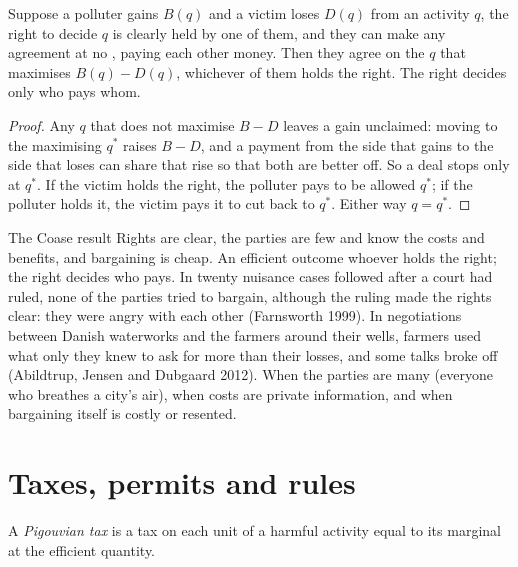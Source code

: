\begin{proposition}\label{prop:g11:externalities:coase}
Suppose a polluter gains $B(q)$ and a victim loses $D(q)$ from an activity $q$, the right to decide $q$ is clearly held by one of them, and they can
make any agreement at no , paying each other money. Then they agree on the $q$ that maximises $B(q) - D(q)$, whichever of them holds the right. The
right decides only who pays whom.
\end{proposition}
\begin{proof}
Any $q$ that does not maximise $B - D$ leaves a gain unclaimed: moving to the maximising $q^*$ raises $B - D$, and a payment from the side that gains to the side
that loses can share that rise so that both are better off. So a deal stops only at $q^*$. If the victim holds the right, the polluter pays to be allowed $q^*$; if
the polluter holds it, the victim pays it to cut back to $q^*$. Either way $q = q^*$.
\end{proof}

\begin{model}{The Coase result}
\assumes Rights are clear, the parties are few and know the costs and benefits, and bargaining is cheap.
\predicts An efficient outcome whoever holds the right; the right decides who pays.
\tested In twenty nuisance cases followed after a court had ruled, none of the parties tried to bargain, although the ruling made the rights clear: they were angry with
  each other (Farnsworth 1999). In negotiations between Danish waterworks and the farmers around their wells, farmers used what only they knew to ask for more than
  their losses, and some talks broke off (Abildtrup, Jensen and Dubgaard 2012).
\breaks When the parties are many (everyone who breathes a city's air), when costs are private information, and when bargaining itself is costly or resented.
\end{model}

\section{Taxes, permits and rules}\label{sec:g11:externalities:instruments}

\begin{definition}\label{def:g11:externalities:pigouvian-tax}
A \emph{Pigouvian tax} is a tax on each unit of a harmful activity equal to its marginal  at the efficient quantity.
\end{definition}

